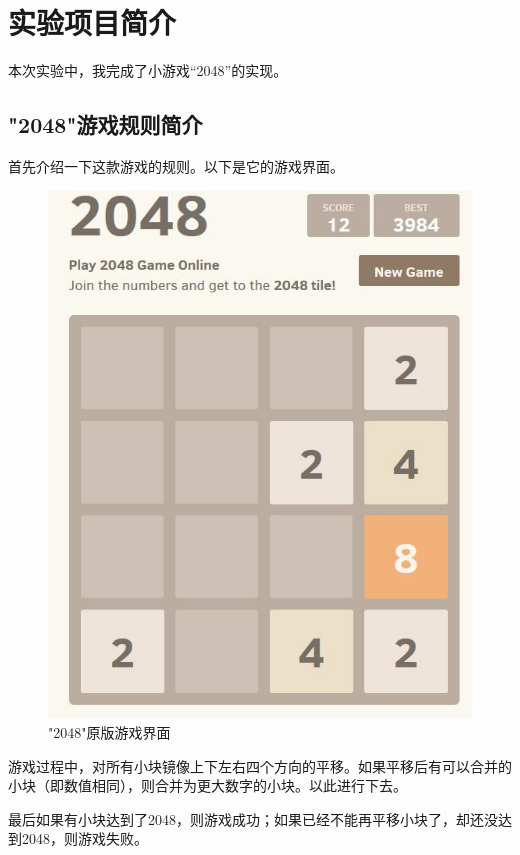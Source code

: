 \documentclass[UTF8]{article}
\begin{document}
	\section{实验项目简介}
	本次实验中，我完成了小游戏“2048”的实现。\par
	\subsection{"2048"游戏规则简介}
	首先介绍一下这款游戏的规则。以下是它的游戏界面。\par
	\begin{figure}[H]
		\centering
		\includegraphics[scale=0.25]{2048_introduction.jpg}
		\caption{"2048"原版游戏界面}
		\label{2048_introduction}
	\end{figure}
	游戏过程中，对所有小块镜像上下左右四个方向的平移。如果平移后有可以合并的小块（即数值相同），则合并为更大数字的小块。以此进行下去。\par
	最后如果有小块达到了2048，则游戏成功；如果已经不能再平移小块了，却还没达到2048，则游戏失败。\par
\end{document}
